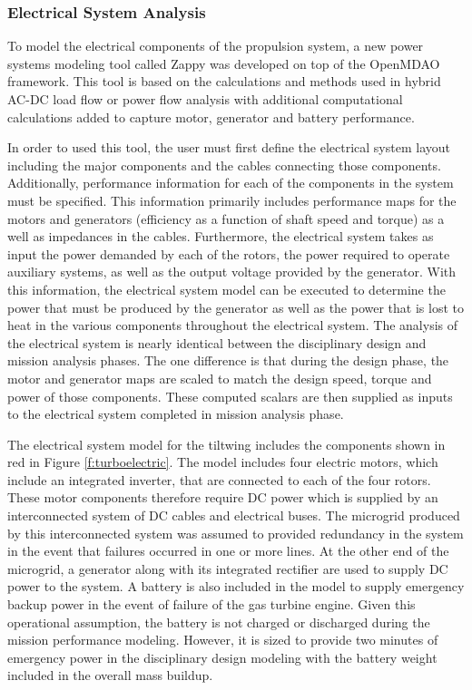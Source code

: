 \subsubsection{Electrical System Analysis} %
To model the electrical components of the propulsion system, a new power systems modeling tool called Zappy was developed on top of the OpenMDAO framework.  
This tool is based on the calculations and methods used in hybrid AC-DC load flow or power flow analysis\cite{hendricks2019load} with additional computational calculations added to capture motor, generator and battery performance. 

In order to used this tool, the user must first define the electrical system layout including the major components and the cables connecting those components.
Additionally, performance information for each of the components in the system must be specified.
This information primarily includes performance maps for the motors and generators (efficiency as a function of shaft speed and torque) as a well as impedances in the cables.
Furthermore, the electrical system takes as input the power demanded by each of the rotors, the power required to operate auxiliary systems, as well as the output voltage provided by the generator.
With this information, the electrical system model can be executed to determine the power that must be produced by the generator as well as the power that is lost to heat in the various components throughout the electrical system.
The analysis of the electrical system is nearly identical between the disciplinary design and mission analysis phases.
The one difference is that during the design phase, the motor and generator maps are scaled to match the design speed, torque and power of those components.  
These computed scalars are then supplied as inputs to the electrical system completed in mission analysis phase. 

The electrical system model for the tiltwing includes the components shown in red in Figure \ref{f:turboelectric}.
The model includes four electric motors, which include an integrated inverter, that are connected to each of the four rotors.
These motor components therefore require DC power which is supplied by an interconnected system of DC cables and electrical buses.
The microgrid produced by this interconnected system was assumed to provided redundancy in the system in the event that failures occurred in one or more lines.
At the other end of the microgrid, a generator along with its integrated rectifier are used to supply DC power to the system.
A battery is also included in the model to supply emergency backup power in the event of failure of the gas turbine engine.
Given this operational assumption, the battery is not charged or discharged during the mission performance modeling.
However, it is sized to provide two minutes of emergency power in the disciplinary design modeling with the battery weight included in the overall mass buildup.


